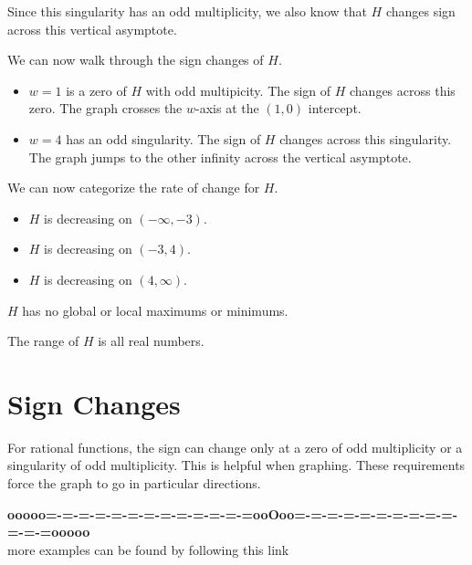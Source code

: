 \documentclass{ximera}
\begin{document}
\begin{example}
Since this singularity has an odd multiplicity, we also know that $H$ changes sign across this vertical asymptote.


We can now walk through the sign changes of $H$.

\begin{itemize}
\item $w = 1$ is a zero of $H$ with odd multipicity.  The sign of $H$ changes across this zero. The graph crosses the $w$-axis at the $(1, 0)$ intercept.
\item $w = 4$ has an odd singularity. The sign of $H$ changes across this singularity.  The graph jumps to the other infinity across the vertical asymptote.
\end{itemize}



We can now categorize the rate of change for $H$.

\begin{itemize}
\item $H$ is decreasing on $(-\infty, -3)$.
\item $H$ is decreasing on $(-3, 4)$.
\item $H$ is decreasing on $(4,\infty)$.
\end{itemize}

$H$ has no global or local maximums or minimums.



The range of $H$ is all real numbers.

\end{example}







\section{Sign Changes}

For rational functions, the sign can change only at a zero of odd multiplicity or a singularity of odd multiplicity. This is helpful when graphing. These requirements force the graph to go in particular directions.




















\begin{center}
\textbf{\textcolor{green!50!black}{ooooo=-=-=-=-=-=-=-=-=-=-=-=-=ooOoo=-=-=-=-=-=-=-=-=-=-=-=-=ooooo}} \\

more examples can be found by following this link\\ 

\end{center}
\end{document}
